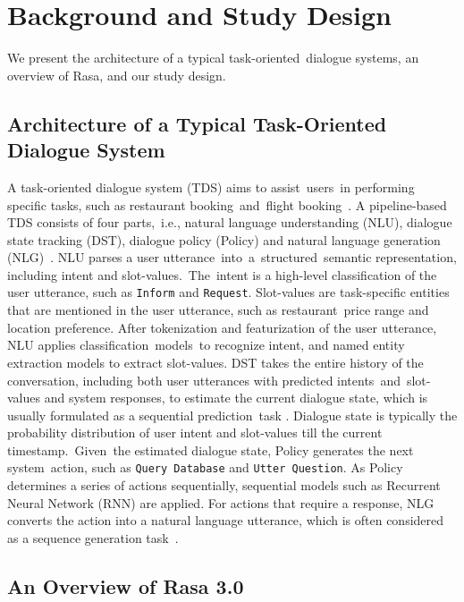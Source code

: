 
\section{Background and Study Design}
\vspace{-3pt}
We present the architecture of a typical task-oriented~dialogue systems, an overview of Rasa, and our study design.

\subsection{Architecture of a Typical Task-Oriented Dialogue System}

A task-oriented dialogue system (TDS) aims to assist~users~in performing specific tasks, such as restaurant booking~and~flight booking~\cite{multiwoz}. 
A pipeline-based TDS consists of four parts,~i.e., natural language understanding (NLU), dialogue state tracking (DST), dialogue policy (Policy) and natural language generation (NLG)~\cite{zhang2020recent}. 
NLU parses a user utterance~into~a~structured~semantic representation, including intent and slot-values.~The~intent is a high-level classification of the user utterance, such as \texttt{Inform} and \texttt{Request}. 
Slot-values are task-specific entities that are mentioned in the user utterance, such as restaurant~price range and location preference. 
After tokenization and featurization of the user utterance, NLU applies classification~models~to recognize intent, and named entity extraction models to extract slot-values. 
DST takes the entire history of the conversation, including both user utterances with predicted intents~and~slot-values and system responses, to estimate the current dialogue state, which is usually formulated as a sequential prediction~task \cite{williams2016dialogstate}.
Dialogue state is typically the probability distribution of user intent and slot-values till the current timestamp.~Given~the estimated dialogue state, Policy generates the next system~action, such as \texttt{Query Database} and \texttt{Utter Question}. 
As Policy determines a series of actions sequentially, sequential models such as Recurrent Neural Network (RNN) are applied. 
For actions that require a response, NLG converts the action into a natural language utterance, which is often considered as a sequence generation task~\cite{wen-etal-2015-semantically}.


\subsection{An Overview of Rasa 3.0}\label{sec:rasa_overview}

